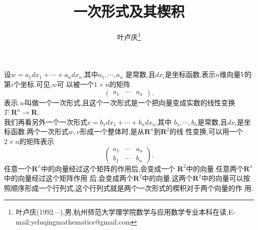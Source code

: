 \documentclass[a4paper]{article}
\begin{document}
\title{\huge{\bf{一次形式及其楔积}}} \author{\small{叶卢庆\footnote{叶卢庆(1992---),男,杭州师范大学理学院数学与应用数学专业本科在读,E-mail:yeluqingmathematics@gmail.com}}}
\maketitle
设$w=a_{1}dx_{1}+\cdots+a_{n}dx_{n}$,其中$a_1,\cdots,a_n$
是常数,且$dx_{i}$是坐标函数,表示$n$维向量$V$的第$i$个坐标.可见,$w$可
以被一个$1\times n$的矩阵
$$
\begin{pmatrix}
  a_1&
\cdots&
a_n
\end{pmatrix}.
$$
表示.$w$叫做一个一次形式,且这个一次形式是一个把向量变成实数的线性变换$T:\mathbf{R}^{n}\to \mathbf{R}$.\\

我们再看另外一个一次形式$v=b_1dx_1+\cdots+b_ndx_n$,其中
$b_1,\cdots,b_n$是常数,且$dx_i$是坐标函数.两个一次形式$w,v$形成一个整体时,是从$\mathbf{R}^{n}$到$\mathbf{R}^{2}$的线
性变换,可以用一个$2\times n$的矩阵表示
$$
\begin{pmatrix}
  a_1&\cdots&a_n\\
b_1&\cdots&b_n
\end{pmatrix}.
$$
任意一个$\mathbf{R}^n$中的向量经过这个矩阵的作用后,会变成一个
$\mathbf{R}^2$中的向量.任意两个$\mathbf{R}^n$中的向量经过这个矩阵作用
后,会变成两个$\mathbf{R}^2$中的向量.这两个$\mathbf{R}^2$中的向量可以按
照顺序形成一个行列式,这个行列式就是两个一次形式的楔积对于两个向量的作
用.
\end{document}
